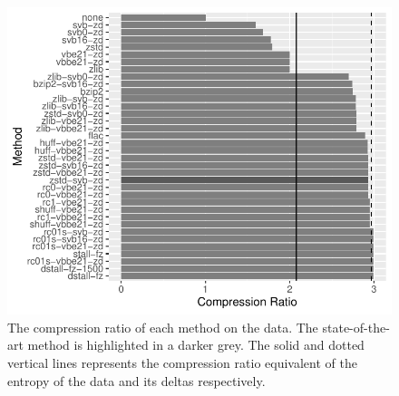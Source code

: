 \begin{figure}
\centering
%
\includegraphics[scale=0.9]{plots/reads.blow5.test.ratio.bar.pdf}
	\caption[The compression ratio of each method on the
	data.]{\label{fig:results-ratio}The compression ratio of each method on the
	data. The state-of-the-art method is highlighted in a darker grey.
	The solid and dotted vertical lines represents the compression ratio
	equivalent of the entropy of the data and its deltas respectively.}
\end{figure}
